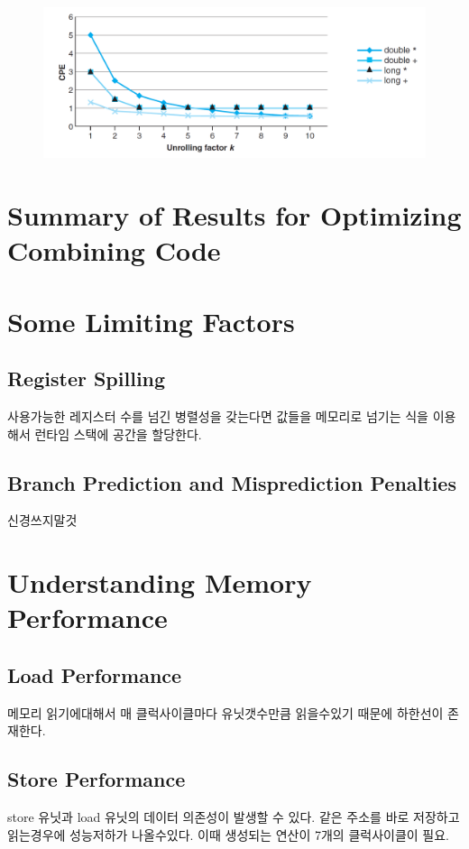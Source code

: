 \begin{figure}[h!]
    \centering
    \includegraphics[scale=0.3]{pic/section5/pic8}
    \caption{}
\end{figure}


\section{Summary of Results for Optimizing Combining Code}

\section{Some Limiting Factors}
\subsection{Register Spilling}
    사용가능한 레지스터 수를 넘긴 병렬성을 갖는다면 값들을 메모리로 넘기는 식을 이용해서 런타임 스택에 공간을 할당한다.
\subsection{Branch Prediction and Misprediction Penalties}
    신경쓰지말것

\section{Understanding Memory Performance}
\subsection{Load Performance}
메모리 읽기에대해서 매 클럭사이클마다 유닛갯수만큼 읽을수있기 때문에 하한선이 존재한다.
\subsection{Store Performance}
store 유닛과 load 유닛의 데이터 의존성이 발생할 수 있다. 같은 주소를 바로 저장하고 읽는경우에 성능저하가 나올수있다. 이때 생성되는 연산이 7개의 클럭사이클이 필요.

